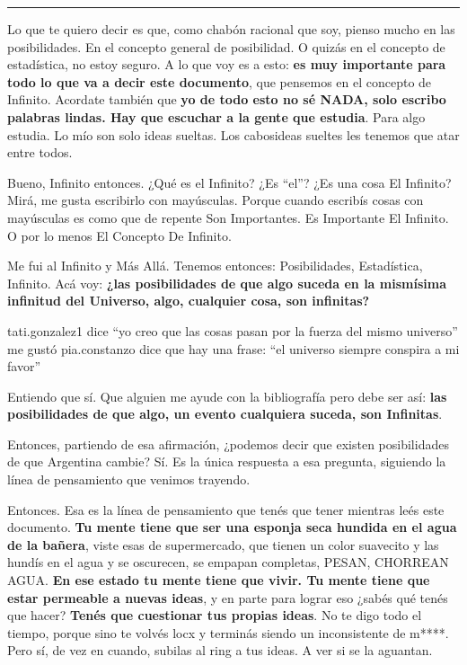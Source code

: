 \documentclass[
]{book}
\begin{document}
\begin{center}\rule{0.5\linewidth}{0.5pt}\end{center}

Lo que te quiero decir es que, como chabón racional que soy, pienso mucho en las posibilidades. En el concepto general de posibilidad. O quizás en el concepto de estadística, no estoy seguro. A lo que voy es a esto: \textbf{es muy importante para todo lo que va a decir este documento}, que pensemos en el concepto de Infinito. Acordate también que \textbf{yo de todo esto no sé NADA, solo escribo palabras lindas. Hay que escuchar a la gente que estudia}. Para algo estudia. Lo mío son solo ideas sueltas. Los cabosideas sueltes les tenemos que atar entre todos.

Bueno, Infinito entonces. ¿Qué es el Infinito? ¿Es ``el''? ¿Es una cosa El Infinito? Mirá, me gusta escribirlo con mayúsculas. Porque cuando escribís cosas con mayúsculas es como que de repente Son Importantes. Es Importante El Infinito. O por lo menos El Concepto De Infinito.

Me fui al Infinito y Más Allá. Tenemos entonces: Posibilidades, Estadística, Infinito. Acá voy: \textbf{¿las posibilidades de que algo suceda en la mismísima infinitud del Universo, algo, cualquier cosa, son infinitas?}

tati.gonzalez1 dice ``yo creo que las cosas pasan por la fuerza del mismo universo'' me gustó
pia.constanzo dice que hay una frase: ``el universo siempre conspira a mi favor''

Entiendo que sí. Que alguien me ayude con la bibliografía pero debe ser así: \textbf{las posibilidades de que algo, un evento cualquiera suceda, son Infinitas}.

Entonces, partiendo de esa afirmación, ¿podemos decir que existen posibilidades de que Argentina cambie? Sí. Es la única respuesta a esa pregunta, siguiendo la línea de pensamiento que venimos trayendo.

Entonces. Esa es la línea de pensamiento que tenés que tener mientras leés este documento. \textbf{Tu mente tiene que ser una esponja seca hundida en el agua de la bañera}, viste esas de supermercado, que tienen un color suavecito y las hundís en el agua y se oscurecen, se empapan completas, PESAN, CHORREAN AGUA. \textbf{En ese estado tu mente tiene que vivir. Tu mente tiene que estar permeable a nuevas ideas}, y en parte para lograr eso ¿sabés qué tenés que hacer? \textbf{Tenés que cuestionar tus propias ideas}. No te digo todo el tiempo, porque sino te volvés locx y terminás siendo un inconsistente de m****. Pero sí, de vez en cuando, subilas al ring a tus ideas. A ver si se la aguantan.
\end{document}
